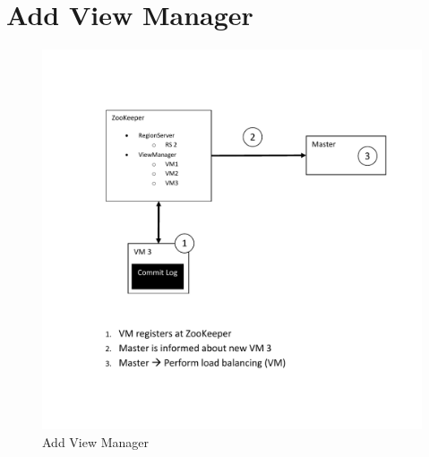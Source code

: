 \section{Add View Manager}
\begin{figure}[h!]
  \centering
    \includegraphics[scale=0.8]{figures/SO_AddViewManager}
    \caption{Add View Manager}
    \label{fig:addviewmanager}
\end{figure}
\newpage

